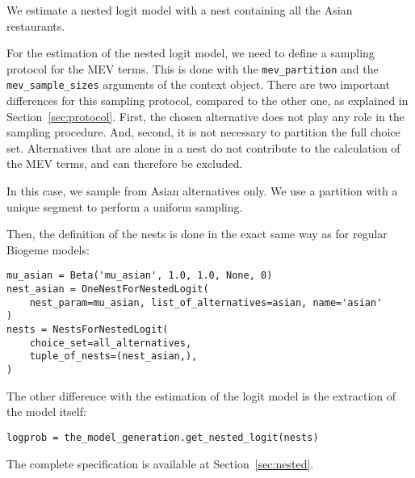 \documentclass[12pt,a4paper]{article}
\begin{document}
We  estimate a nested logit model with a nest containing all the Asian restaurants.

For the estimation of the nested logit model, we need to define a
sampling protocol for the MEV terms. This is done with the
\lstinline+mev_partition+ and the \lstinline+mev_sample_sizes+
arguments of the context object. There are two important differences
for this sampling protocol, compared to the other one, as explained in
Section~\ref{sec:protocol}. First, the chosen alternative does not
play any role in the sampling procedure. And, second, it is not
necessary to partition the full choice set. Alternatives that are
alone in a nest do not contribute to the calculation of the MEV
terms, and can therefore be excluded.

In this case, we sample from Asian alternatives only. We use a partition with a unique segment to perform a uniform sampling. 

Then, the definition of the nests is done in the exact same way as for regular Biogeme models:
\begin{lstlisting}
mu_asian = Beta('mu_asian', 1.0, 1.0, None, 0)
nest_asian = OneNestForNestedLogit(
    nest_param=mu_asian, list_of_alternatives=asian, name='asian'
)
nests = NestsForNestedLogit(
    choice_set=all_alternatives,
    tuple_of_nests=(nest_asian,),
)
\end{lstlisting}

The other difference with the estimation of the logit model is the extraction of the model itself:
\begin{lstlisting}
logprob = the_model_generation.get_nested_logit(nests)
\end{lstlisting}
The complete specification is available at Section~\ref{sec:nested}.
\end{document}
